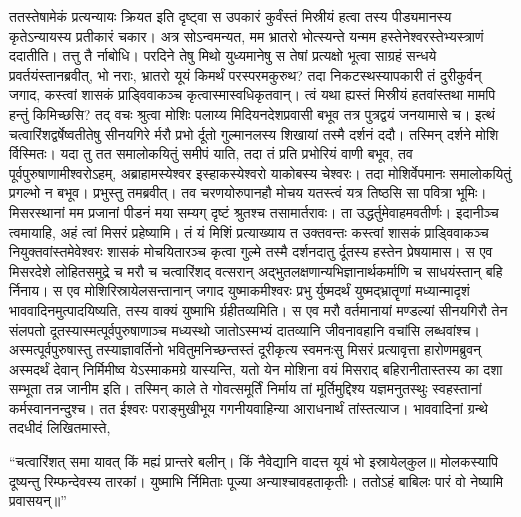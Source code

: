 \vakya ततस्तेषामेकं प्रत्यन्यायः क्रियत इति दृष्ट्वा स उपकारं कुर्वंस्तं मिस्रीयं हत्वा तस्य पीड्यमानस्य कृतेऽन्यायस्य प्रतीकारं चकार।
\vakya अत्र सोऽन्वमन्यत, मम भ्रातरो भोत्स्यन्ते यन्मम हस्तेनेश्वरस्तेभ्यस्त्राणं ददातीति।
\vakya तत्तु तै र्नाबोधि। परदिने तेषु मिथो युध्यमानेषु स तेषां प्रत्यक्षो भूत्वा साग्रहं सन्धये प्रवर्तयंस्तानब्रवीत्,
\vakya भो नराः, भ्रातरो यूयं किमर्थं परस्परमकुरुथ? तदा निकटस्थस्यापकारी तं दुरीकुर्वन् जगाद, कस्त्वां शासकं प्राड्विवाकञ्च कृत्वास्मास्वधिकृतवान्।
\vakya त्वं यथा ह्यस्तं मिस्रीयं हतवांस्तथा मामपि हन्तुं किमिच्छसि?
\vakya तद् वचः श्रुत्वा मोशिः पलाय्य मिदियनदेशप्रवासी बभूव तत्र पुत्रद्वयं जनयामासे च।
\vakya इत्थं चत्वारिंशद्वर्षेष्वतीतेषु सीनयगिरे र्मरौ प्रभो र्दूतो गुल्मानलस्य शिखायां तस्मै दर्शनं ददौ।
\vakya तस्मिन् दर्शने मोशि र्विस्मितः। यदा तु तत समालोकयितुं समीपं याति, तदा तं प्रति प्रभोरियं वाणी बभूव,
\vakya तव पूर्वपुरुषाणामीश्वरोऽहम्, अब्राहामस्येश्वर इस्हाकस्येश्वरो याकोबस्य चेश्वरः। तदा मोशिर्वेपमानः समालोकयितुं प्रगल्भो न बभूव।
\vakya प्रभुस्तु तमब्रवीत्। तव चरणयोरुपानहौ मोचय यतस्त्वं यत्र तिष्ठसि सा पवित्रा भूमिः।
\vakya मिसरस्थानां मम प्रजानां पीडनं मया सम्यग् दृष्टं श्रुतश्च तसामार्तरावः। ता उद्धर्तुमेवाहमवतीर्णः। इदानीञ्च त्वमायाहि, अहं त्वां मिसरं प्रहेष्यामि।
\vakya तं यं मिशिं प्रत्याख्याय त उक्तवन्तः कस्त्वां शासकं प्राड्विवाकञ्च नियुक्तवांस्तमेवेश्वरः शासकं मोचयितारञ्च कृत्वा गुल्मे तस्मै दर्शनदातु र्दूतस्य हस्तेन प्रेषयामास।
\vakya स एव मिसरदेशे लोहितसमुद्रे च मरौ च चत्वारिंशद् वत्सरान् अद्भुतलक्षणान्यभिज्ञानार्थकर्माणि च साधयंस्तान् बहि र्निनाय।
\vakya स एव मोशिरिस्रायेलसन्तानान् जगाद युष्माकमीश्वरः प्रभु र्युष्मदर्थं युष्मद्भ्रातॄणां मध्यान्मादृशं भाववादिनमुत्पादयिष्यति, तस्य वाक्यं युष्माभि र्ग्रहीतव्यमिति।
\vakya स एव मरौ वर्तमानायां मण्डल्यां सीनयगिरौ तेन संलपतो दूतस्यास्मत्पूर्वपुरुषाणाञ्च मध्यस्थो जातोऽस्मभ्यं दातव्यानि जीवनावहानि वचांसि लब्धवांश्च।
\vakya अस्मत्पूर्वपुरुषास्तु तस्याज्ञावर्तिनो भवितुमनिच्छन्तस्तं दूरीकृत्य स्वमनःसु मिसरं प्रत्यावृत्ता हारोणमब्रुवन्
\vakya अस्मदर्थं देवान् निर्मिमीष्व येऽस्माकमग्रे यास्यन्ति, यतो येन मोशिना वयं मिसराद् बहिरानीतास्तस्य का दशा सम्भूता तन्न जानीम इति।
\vakya तस्मिन् काले ते गोवत्समूर्तिं निर्माय तां मूर्तिमुद्दिश्य यज्ञमनुतस्थुः स्वहस्तानां कर्मस्वाननन्दुश्च।
\vakya तत ईश्वरः पराङ्मुखीभूय गगनीयवाहिन्या आराधनार्थं तांस्तत्याज। भाववादिनां ग्रन्थे तदधीदं लिखितमास्ते,
\begin{poem}
\startwithline “चत्वारिंशत् समा यावत् किं मह्यं प्रान्तरे बलीन्।
\pline किं नैवेद्यानि वादत्त यूयं भो इस्रायेल्‌कुल॥
\vakya मोलकस्यापि दूष्यन्तु रिम्फन्देवस्य तारकां।
\pline युष्माभि र्निमिताः पूज्या अन्याश्चावहताकृतीः।
\pline ततोऽहं बाबिलः पारं वो नेष्यामि प्रवासयन्॥”
\end{poem}
